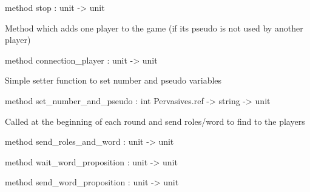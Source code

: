 \documentclass[11pt]{article}
\begin{document}
\begin{ocamldocobjectend}
\begin{ocamldocdescription}
\end{ocamldocdescription}


\label{method:Server.player.stop}\begin{ocamldoccode}
method stop : unit -> unit
\end{ocamldoccode}
\begin{ocamldocdescription}
Method which adds one player to the game (if its pseudo is not used by another player)


\end{ocamldocdescription}


\label{method:Server.player.connection-underscoreplayer}\begin{ocamldoccode}
method connection_player : unit -> unit
\end{ocamldoccode}
\begin{ocamldocdescription}
Simple setter function to set number and pseudo variables


\end{ocamldocdescription}


\label{method:Server.player.set-underscorenumber-underscoreand-underscorepseudo}\begin{ocamldoccode}
method set_number_and_pseudo : int Pervasives.ref -> string -> unit
\end{ocamldoccode}
\begin{ocamldocdescription}
Called at the beginning of each round and send roles/word to find to the players


\end{ocamldocdescription}


\label{method:Server.player.send-underscoreroles-underscoreand-underscoreword}\begin{ocamldoccode}
method send_roles_and_word : unit -> unit
\end{ocamldoccode}


\label{method:Server.player.wait-underscoreword-underscoreproposition}\begin{ocamldoccode}
method wait_word_proposition : unit -> unit
\end{ocamldoccode}


\label{method:Server.player.send-underscoreword-underscoreproposition}\begin{ocamldoccode}
method send_word_proposition : unit -> unit
\end{ocamldoccode}



\end{ocamldocobjectend}
\end{document}
